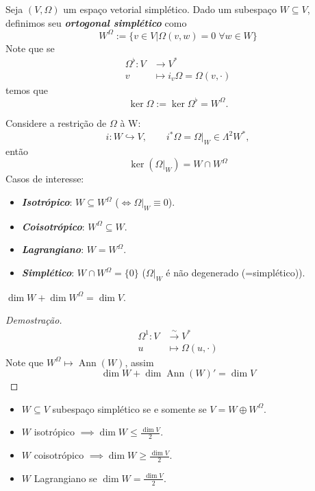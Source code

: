 \begin{defn}
	Seja $(V,\Omega)$ um espaço vetorial simplético. Dado um subespaço $W\subseteq V$, definimos seu \textit{\textbf{ortogonal simplético}} como
\[W^{\Omega} :=\{v\in V|\Omega(v,w)=0\;\forall w\in W\}\]
Note que se
\begin{align*}
	\Omega^\flat: V &\longrightarrow V^* \\
	v &\longmapsto i_v\Omega=\Omega(v,\cdot )
\end{align*}
temos que
\[\ker \Omega:=\ker \Omega^\flat=W^\Omega.\]

Considere a restri\c c\~ao  de $\Omega$ \`a W:
	\[i:W\hookrightarrow V,\qquad i^{*} \Omega=\Omega|_{W}\in \Lambda^2W^{*},\]
	ent\~ao
	\[\ker (\Omega|_{W})=W\cap W^{\Omega}\]
Casos de interesse:
\begin{itemize}
	\item \textit{\textbf{Isotr\'opico}}: $W\subseteq W^{\Omega}$ ($\iff\Omega|_{W}\equiv 0$).
	\item \textit{\textbf{Coisotr\'opico}}: $W^{\Omega} \subseteq W$.
	\item  \textit{\textbf{Lagrangiano}}: $W=W^{\Omega}$.
	\item \textit{\textbf{Simpl\'etico}}: $W\cap W^{\Omega} =\{0\}$ ($\Omega|_{W}$ \'e n\~ao degenerado (=simpl\'etico)). 
\end{itemize}
\end{defn}

\begin{lemma}
	$\dim W+\dim W^{\Omega} =\dim V$.
\end{lemma}
\begin{proof}[Demostra\c c\~ao]
	\begin{align*}
		\Omega^{1}: V &\overset{\sim}{\to }V^{*} \\
	u &\longmapsto \Omega(u,\cdot )
	\end{align*}
	Note que $W^{\Omega} \mapsto \operatorname{Ann}(W)$, assim
	\[\dim W+\dim \operatorname{Ann}(W)'=\dim V\]
\end{proof}

\begin{remark}\leavevmode
	\begin{itemize}
		\item $W\subseteq V$ subespa\c co simpl\'etico  se e somente se  $V=W\oplus W^{\Omega}$.
		\item $W$ isotr\'opico $\implies \dim W\leq \frac{\dim V}{2}$.
		\item $W$ coisotr\'opico $\implies \dim W\geq \frac{\dim V}{2}$.
		\item $W$ Lagrangiano se $\dim W=\frac{\dim V}{2}$.
	\end{itemize}
\end{remark}


